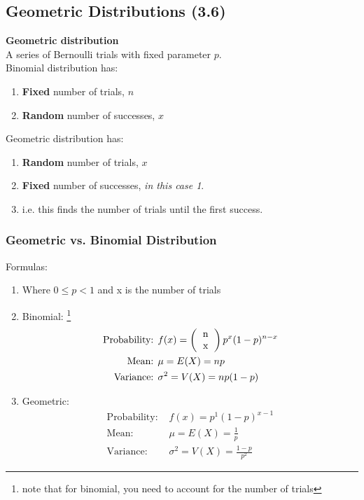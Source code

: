 \documentclass[../INDE315.tex]{subfiles}
\begin{document}
\subsection*{Geometric Distributions (3.6)}
\begin{defn}
    \textbf{Geometric distribution} \\
    A series of Bernoulli trials with fixed parameter $p$. \\
    Binomial distribution has:
    \begin{enumerate}
        \item \textbf{Fixed} number of trials, $n$
        \item \textbf{Random} number of successes, $x$
    \end{enumerate}
    Geometric distribution has:
    \begin{enumerate}
        \item \textbf{Random} number of trials, $x$
        \item \textbf{Fixed} number of successes, \emph{in this case 1}.
        \item i.e. this finds the number of trials until the first success.
    \end{enumerate}
\end{defn}
\subsubsection*{Geometric vs. Binomial Distribution}
Formulas:
\begin{enumerate}
    \item Where $0 \leq p < 1$ and x is the number of trials
    \item Binomial: \footnote{note that for binomial, you need to account for the number of trials}
        \begin{equation*}
            \begin{aligned}
                \text{Probability: } &  f(x) = \left( \begin{tabular}{c}
                    n \\
                    x
                    \end{tabular}  \right) p^x (1 - p)^{n-x} \\
                \text{Mean: } & \mu = E(X) = np \\
                \text{Variance: } & \sigma ^2 = V(X) = np(1-p)
            \end{aligned}
        \end{equation*}
    \item Geometric:
        \begin{equation*}
            \begin{aligned}
                \text{Probability: } &  f(x) = p^1 (1-p)^{x-1} \\
                \text{Mean: } &  \mu = E(X) = \frac{1}{p} \\
                \text{Variance: } & \sigma ^2 = V(X) = \frac{1-p}{p^2}  
            \end{aligned}
        \end{equation*}
\end{enumerate}
\end{document}
